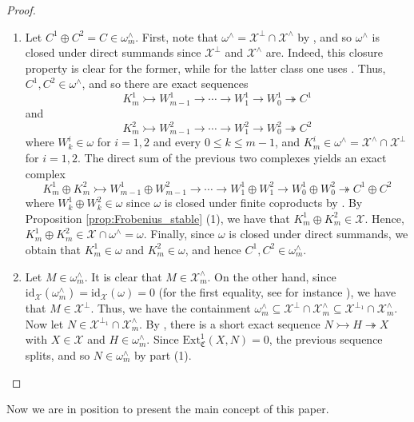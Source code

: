 \documentclass[10pt,reqno]{amsart}
\numberwithin{equation}{section}
\theoremstyle{remark}
\newcommand{\Ext}{\mathrm{Ext}}
\newcommand{\X}{\mathcal{X}}
\newcommand{\id}{\mathrm{id}}
\begin{document}
\begin{proof} ~\
\begin{enumerate}[(1)]
\item Let $C^1 \oplus C^2 = C \in \omega^\wedge_m$. First, note that $\omega^\wedge = \mathcal{X}^\perp \cap \mathcal{X}^\wedge$ by \cite[Prop. 2.13]{BMSP}, and so $\omega^\wedge$ is closed under direct summands since $\mathcal{X}^\perp$ and $\mathcal{X}^\wedge$ are. Indeed, this closure property is clear for the former, while for the latter class one uses \cite[Thm. 2.11]{BMSP}. Thus, $C^1, C^2 \in \omega^\wedge$, and so there are exact sequences
\[
K^1_m \rightarrowtail W^1_{m-1} \to \cdots \to W^1_1 \to W^1_0 \twoheadrightarrow C^1
\]
and
\[
K^2_m \rightarrowtail W^2_{m-1} \to \cdots \to W^2_1 \to W^2_0 \twoheadrightarrow C^2
\]
where $W^i_k \in \omega$ for $i = 1, 2$ and every $0 \leq k \leq m-1$, and $K^i_m \in \omega^\wedge = \mathcal{X}^\wedge \cap \mathcal{X}^\perp$ for $i = 1, 2$. The direct sum of the previous two complexes yields an exact complex
\[
K^1_m \oplus K^2_m \rightarrowtail W^1_{m-1} \oplus W^2_{m-1} \to \cdots \to W^1_1 \oplus W^2_1 \to W^1_0 \oplus W^2_0 \twoheadrightarrow C^1 \oplus C^2
\]
where $W^1_k \oplus W^2_k \in \omega$ since $\omega$ is closed under finite coproducts by \cite[Prop. 2.7 (2)]{BMSP}. By Proposition \ref{prop:Frobenius_stable} (1), we have that $K^1_m \oplus K^2_m \in \mathcal{X}$. Hence, $K^1_m \oplus K^2_m \in \mathcal{X} \cap \omega^\wedge = \omega$. Finally, since $\omega$ is closed under direct summands, we obtain that $K^1_m \in \omega$ and $K^2_m \in \omega$, and hence $C^1, C^2 \in \omega^\wedge_m$.

\item Let $M \in \omega^\wedge_m$. It is clear that $M \in \X^\wedge_m$. On the other hand, since $\id_{\X}(\omega^\wedge_m) = \id_{\mathcal{X}}(\omega) = 0$ (for the first equality, see for instance \cite[Lem. 2.1]{BMSP}), we have that $M \in \mathcal{X}^\perp$. Thus, we have the containment $\omega^\wedge_m \subseteq \X^{\perp} \cap \X^\wedge_m \subseteq \X^{\perp_1} \cap \X^\wedge_m$. Now let $N \in \mathcal{X}^{\perp_1} \cap \mathcal{X}^\wedge_m$. By \cite[Thm. 2.8]{BMSP}, there is a short exact sequence $N \rightarrowtail H \twoheadrightarrow X$ with $X \in \mathcal{X}$ and $H \in \omega^\wedge_m$. Since $\Ext^1_{\mathfrak{C}}(X,N) = 0$, the previous sequence splits, and so $N \in \omega^\wedge_m$ by part (1). 
\end{enumerate}
\end{proof}


Now we are in position to present the main concept of this paper. 
\end{document}
